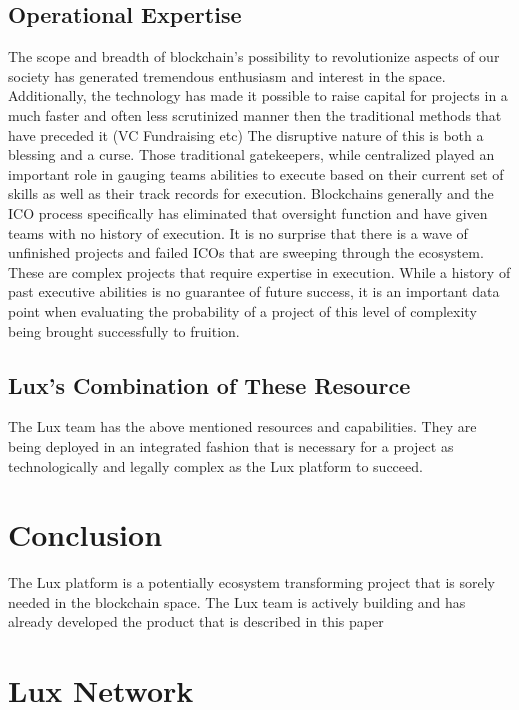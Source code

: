 \documentclass[11pt]{article}
\begin{document}
\subsection{Operational Expertise}

The scope and breadth of blockchain's possibility to revolutionize aspects of our society has generated tremendous enthusiasm and interest in the space. Additionally, the technology has made it possible to raise capital for projects in a much faster and often less scrutinized manner then the traditional methods that have preceded it (VC Fundraising etc) The disruptive nature of this is both a blessing and a curse. Those traditional gatekeepers, while centralized played an important role in gauging teams abilities to execute based on their current set of skills as well as their track records for execution. Blockchains generally and the ICO process specifically has eliminated that oversight function and have given teams with no history of execution. It is no surprise that there is a wave of unfinished projects and failed ICOs that are sweeping through the ecosystem. These are complex projects that require expertise in execution. While a history of past executive abilities is no guarantee of future success, it is an important data point when evaluating the probability of a project of this level of complexity being brought successfully to fruition.


\subsection{Lux's Combination of These Resource}

The Lux team has the above mentioned resources and capabilities. They are being deployed in an integrated fashion that is necessary for a project as technologically and legally complex as the Lux platform to succeed.


\section{Conclusion}

The Lux platform is a potentially ecosystem transforming project that is sorely needed in the blockchain space. The Lux team is actively building and has already developed the product that is described in this paper


\section{Lux Network}
\end{document}
